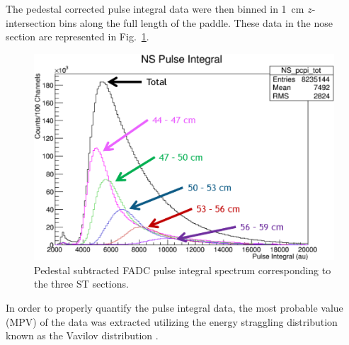 The pedestal corrected pulse integral data were then binned in 1~cm $z$-intersection bins along the full length of the paddle. These data in the nose section are represented in Fig.~\ref{fig:pisecnose}.
	\begin{figure}
		\centering
		\includegraphics[width=1.0\columnwidth]{calibration/figs/pi_sec_nose}
		\caption{Pedestal subtracted FADC pulse integral spectrum corresponding to the three ST sections.}
		\label{fig:pisecnose}
	\end{figure}
In order to properly quantify the pulse integral data, the most probable value (MPV) of the data was extracted utilizing the energy straggling distribution known as the Vavilov distribution \cite{vavilov_1957}.  

